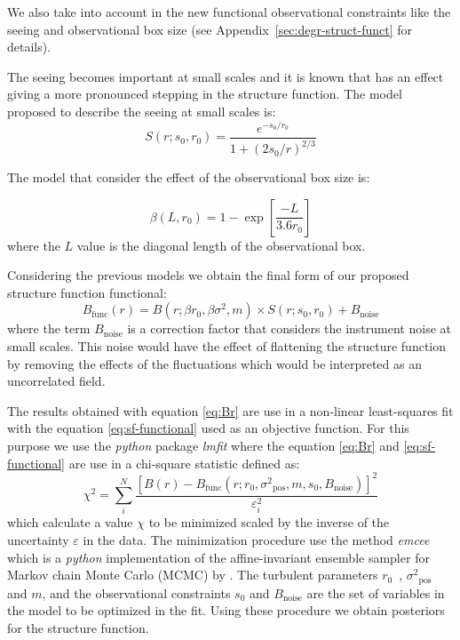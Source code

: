 \documentclass[fleqn,usenatbib, useAMS, a4paper]{mnras}
\newcommand\pos{\ensuremath{_{\mathrm{pos}}}}
\begin{document}
We also take into account in the new functional observational constraints like the seeing and observational box size (see Appendix~\ref{sec:degr-struct-funct} for details). 

The seeing becomes important at small scales and it is known that has an effect giving a more pronounced stepping in the structure function.
The model proposed to describe the seeing at small scales is:
%
\begin{equation}\label{eq:ffs}
   S(r; s_0, r_0) = \frac{
    e^{-s_0 / r_0}
  }{
    1+(2s_0 / r)^{2 / 3}
  }
\end{equation}

The model that consider the effect of the observational box size is:

\begin{equation}\label{eq:ffb}
  \beta(L,r_0) = 1 - \exp \left[ \frac{-L} {3.6 r_0} \right] 
\end{equation}
%
where the \(L\) value is the diagonal length of the observational box.

Considering the previous models we obtain the final form of our proposed structure function functional:
%
\begin{equation}\label{eq:sf-functional}
B_{\text{func}}(r) = B(r; \beta r_0, \beta \sigma^2,m) \times S(r; s_0, r_0) + B_{\text{noise}}
\end{equation}
%
where the term \( B_{\text{noise}}\) is a correction factor that considers the instrument noise at small scales.
This noise would have the effect of flattening the structure function by removing the effects of the fluctuations which would be interpreted as an uncorrelated field. 

The results obtained with equation \ref{eq:Br} are use in a non-linear least-squares fit with the equation \ref{eq:sf-functional} used as an objective function.
For this purpose we use the \textit{python} package \textit{lmfit} \citep{newville_matthew_2014_11813} where the equation \ref{eq:Br} and \ref{eq:sf-functional} are use in a chi-square statistic defined as:
%
%
%
\begin{equation}\label{eq:chi}
  \chi^2 = \sum_i ^N \frac{[B(r)-B_{\text{func}}(r;r_0, \sigma^2\pos, m, s_0, B_{\text{noise}})]^2}{\varepsilon_i ^2}
\end{equation}
%
which calculate a value \(\chi\) to be minimized scaled by the inverse of the uncertainty \(\varepsilon\) in the data.
The minimization procedure use the method \textit{emcee} \citep{2013PASP..125..306F} which is a \textit{python} implementation of the affine-invariant ensemble sampler for Markov chain Monte Carlo (MCMC) by \citet{2010CAMCS...5...65G}.  
The turbulent parameters \(r_{0}\)\ , \(\sigma^2\pos\) and \(m\), and the observational constraints \(s_0\) and \( B_{\text{noise}}\) are the set of variables in the model to be optimized in the fit.
Using these procedure we obtain posteriors for the structure function.
\end{document}
